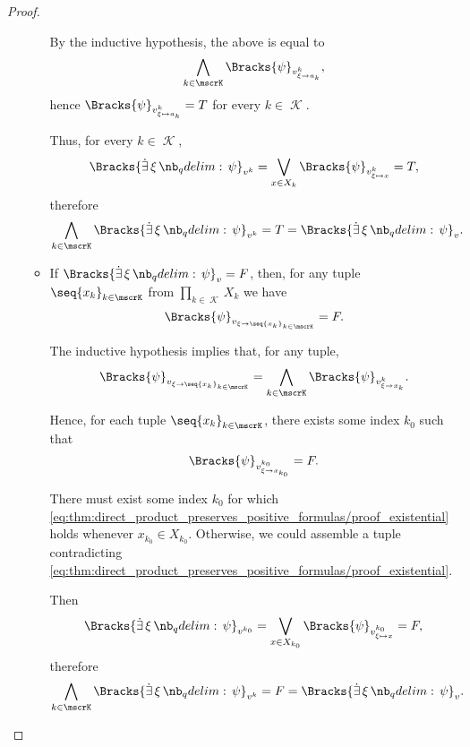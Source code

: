 \begin{proof}
\begin{itemize}
\begin{itemize}
      By the inductive hypothesis, the above is equal to
      \begin{equation*}
        \bigwedge_{k \in \mscrK} \Bracks{\psi}_{v^k_{\xi \to a_k}},
      \end{equation*}
      hence \( \Bracks{\psi}_{v^k_{\xi \mapsto a_k}} = T \) for every \( k \in \mscrK \).

      Thus, for every \( k \in \mscrK \),
      \begin{equation*}
        \Bracks{\qexists \xi \psi}_{v^k}
        =
        \bigvee_{x \in X_k} \Bracks{\psi}_{v^k_{\xi \mapsto x}}
        =
        T,
      \end{equation*}
      therefore
      \begin{equation*}
        \bigwedge_{k \in \mscrK} \Bracks{\qexists \xi \psi}_{v^k}
        =
        T
        =
        \Bracks{\qexists \xi \psi}_v.
      \end{equation*}

      \item If \( \Bracks{\qexists \xi \psi}_v = F \), then, for any tuple \( \seq{ x_k }_{k \in \mscrK} \) from \( \prod_{k \in \mscrK} X_k \) we have
      \begin{equation*}
        \Bracks{\psi}_{v_{\xi \to \seq{ x_k }_{k \in \mscrK}}} = F.
      \end{equation*}

      The inductive hypothesis implies that, for any tuple,
      \begin{equation*}
        \Bracks{\psi}_{v_{\xi \to \seq{ x_k }_{k \in \mscrK}}} = \bigwedge_{k \in \mscrK} \Bracks{\psi}_{v^k_{\xi \to x_k}}.
      \end{equation*}

      Hence, for each tuple \( \seq{ x_k }_{k \in \mscrK} \), there exists some index \( k_0 \) such that
      \begin{equation}\label{eq:thm:direct_product_preserves_positive_formulas/proof_existential}
        \Bracks{\psi}_{v^{k_0}_{\xi \to x_{k_0}}} = F.
      \end{equation}

      There must exist some index \( k_0 \) for which \eqref{eq:thm:direct_product_preserves_positive_formulas/proof_existential} holds whenever \( x_{k_0} \in X_{k_0} \). Otherwise, we could assemble a tuple contradicting \eqref{eq:thm:direct_product_preserves_positive_formulas/proof_existential}.

      Then
      \begin{equation*}
        \Bracks{\qexists \xi \psi}_{v^{k_0}}
        =
        \bigvee_{x \in X_{k_0}} \Bracks{\psi}_{v^{k_0}_{\xi \mapsto x}}
        =
        F,
      \end{equation*}
      therefore
      \begin{equation*}
        \bigwedge_{k \in \mscrK} \Bracks{\qexists \xi \psi}_{v^k}
        =
        F
        =
        \Bracks{\qexists \xi \psi}_v.
      \end{equation*}
    \end{itemize}
  \end{itemize}


\end{proof}
